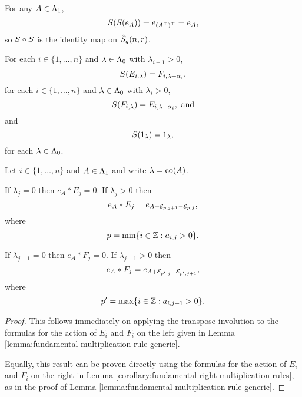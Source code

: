 \documentclass[a4paper, 11pt]{report}
\begin{document}
For any $A\in\Lambda_1{}$,
\begin{equation*}
S{(S{(e_A)})} = e_{(A^\top)^\top} = e_A,
\end{equation*}
so $S{}\circ S{}$ is the identity map on $\hat{S}_q(n,r)$.

For each $i\in\{1,\ldots,n\}$ and $\lambda\in\Lambda_0{}$ with $\lambda_{i+1}>0$,
\begin{equation*}
S{(E_{i,\lambda})} = F_{i,\lambda+\alpha_i},
\end{equation*}
for each $i\in\{1,\ldots,n\}$ and $\lambda\in\Lambda_0{}$ with $\lambda_i>0$,
\begin{equation*}
S{(F_{i,\lambda})} = E_{i,\lambda - \alpha_i}, \text{ and}
\end{equation*}
and
\begin{equation*}
S{(1_\lambda)} = 1_\lambda,
\end{equation*}
for each $\lambda\in\Lambda_0{}$.

\begin{lemma}\label{lemma:fundamental-multiplication-rule-generic-R}
Let $i\in\{1,\ldots,n\}$ and $A\in\Lambda_1{}$ and write $\lambda=\operatorname{co}(A)$.

If $\lambda_j=0$ then $e_A\ast E_j=0$. If $\lambda_j>0$ then
\begin{equation*}
e_A\ast E_j =e_{A+\mathcal{E}_{p,j+1}-\mathcal{E}_{p,j}},
\end{equation*}
where
\begin{equation*}
p=\min\{i\in\mathbb{Z}:a_{i,j}>0\}.
\end{equation*}

If $\lambda_{j+1}=0$ then $e_A\ast F_j=0$. If $\lambda_{j+1}>0$ then
\begin{equation*}
e_A\ast F_j = e_{A+\mathcal{E}_{p',j}-\mathcal{E}_{p',j+1}},
\end{equation*}
where
\begin{equation*}
p'=\max\{i\in\mathbb{Z}:a_{i,j+1}>0\}.
\end{equation*}
\end{lemma}

\begin{proof}
This follows immediately on applying the transpose involution to the formulas for the action of $E_i$ and $F_i$ on the left given in Lemma \ref{lemma:fundamental-multiplication-rule-generic}.

Equally, this result can be proven directly using the formulas for the action of $E_i$ and $F_i$ on the right in Lemma \ref{corollary:fundamental-right-multiplication-rules}, as in the proof of Lemma \ref{lemma:fundamental-multiplication-rule-generic}.
\end{proof}
\end{document}
